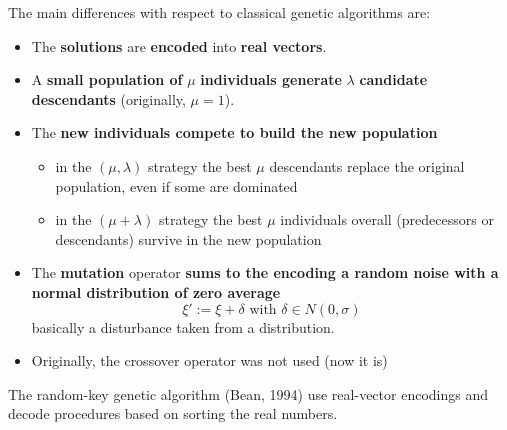 \documentclass[11pt]{article}
\begin{document}
	The main differences with respect to classical genetic algorithms are:
	\begin{itemize}
		\item The \textbf{solutions} are \textbf{encoded} into \textbf{real vectors}.\\
		
		\item A \textbf{small population of} $\mu$ \textbf{individuals generate} $\lambda$ \textbf{candidate descendants} (originally, $\mu = 1$).\\
		
		\item The \textbf{new individuals compete to build the new population}
		\begin{itemize}
			\item in the $(\mu, \lambda)$ strategy the best $\mu$ descendants replace the original population, even if some are dominated
			\item in the $(\mu + \lambda)$ strategy the best $\mu$ individuals overall (predecessors or descendants) survive in the new population
		\end{itemize}
		\nn
		
		\item The \textbf{mutation} operator \textbf{sums to the encoding a random noise with a normal distribution of zero average}
		$$ \xi' := \xi + \delta \text{ with } \delta \in N(0, \sigma) $$
		basically a disturbance taken from a distribution.\\
		
		\item Originally, the crossover operator was not used (now it is)
	\end{itemize}
	
	The random-key genetic algorithm (Bean, 1994) use real-vector encodings and decode procedures based on sorting the real numbers.\\
	
		
\end{document}
